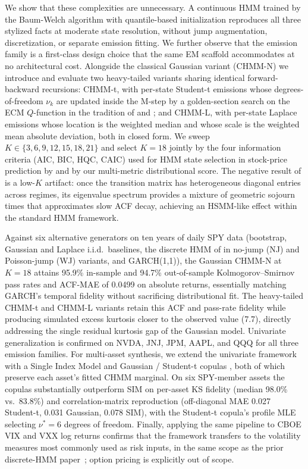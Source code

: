We show that these complexities are unnecessary.
A continuous HMM trained by the Baum-Welch algorithm \cite{baum1970maximization, rabiner1986introduction} with quantile-based initialization reproduces all three stylized facts at moderate state resolution, without jump augmentation, discretization, or separate emission fitting.
We further observe that the emission family is a first-class design choice that the same EM scaffold accommodates at no architectural cost.
Alongside the classical Gaussian variant (CHMM-N) we introduce and evaluate two heavy-tailed variants sharing identical forward-backward recursions: CHMM-t, with per-state Student-t emissions whose degrees-of-freedom $\nu_k$ are updated inside the M-step by a golden-section search on the ECM $Q$-function in the tradition of \citet{peel2000robust} and \citet{liu1995ml}; and CHMM-L, with per-state Laplace emissions whose location is the weighted median and whose scale is the weighted mean absolute deviation, both in closed form.
We sweep $K \in \{3, 6, 9, 12, 15, 18, 21\}$ and select $K = 18$ jointly by the four information criteria (AIC, BIC, HQC, CAIC) used for HMM state selection in stock-price prediction by \citet{nguyen2018hidden} and by our multi-metric distributional score.
The negative result of \citet{ryden1998stylized} is a low-$K$ artifact: once the transition matrix has heterogeneous diagonal entries across regimes, its eigenvalue spectrum provides a mixture of geometric sojourn times that approximates slow ACF decay, achieving an HSMM-like effect within the standard HMM framework.

Against six alternative generators on ten years of daily SPY data (bootstrap, Gaussian and Laplace i.i.d.\ baselines, the discrete HMM of \citet{alswaidan2026hybrid} in no-jump (NJ) and Poisson-jump (WJ) variants, and GARCH(1,1)), the Gaussian CHMM-N at $K = 18$ attains 95.9\% in-sample and 94.7\% out-of-sample Kolmogorov--Smirnov pass rates and ACF-MAE of 0.0499 on absolute returns, essentially matching GARCH's temporal fidelity without sacrificing distributional fit.
The heavy-tailed CHMM-t and CHMM-L variants retain this ACF and pass-rate fidelity while producing simulated excess kurtosis closer to the observed value (7.7), directly addressing the single residual kurtosis gap of the Gaussian model.
Univariate generalization is confirmed on NVDA, JNJ, JPM, AAPL, and QQQ for all three emission families.
For multi-asset synthesis, we extend the univariate framework with a Single Index Model \cite{sharpe1963simplified} and Gaussian / Student-t copulas \cite{sklar1959fonctions, demarta2005tcopula, mcneil2015quantitative}, both of which preserve each asset's fitted CHMM marginal.
On six SPY-member assets the copulas substantially outperform SIM on per-asset KS fidelity (median 98.0\% vs.\ 83.8\%) and correlation-matrix reproduction (off-diagonal MAE 0.027 Student-t, 0.031 Gaussian, 0.078 SIM), with the Student-t copula's profile MLE selecting $\nu^{*} = 6$ degrees of freedom.
Finally, applying the same pipeline to CBOE VIX and VXX log returns confirms that the framework transfers to the volatility measures most commonly used as risk inputs, in the same scope as the prior discrete-HMM paper~\citep{alswaidan2026hybrid}; option pricing is explicitly out of scope.


